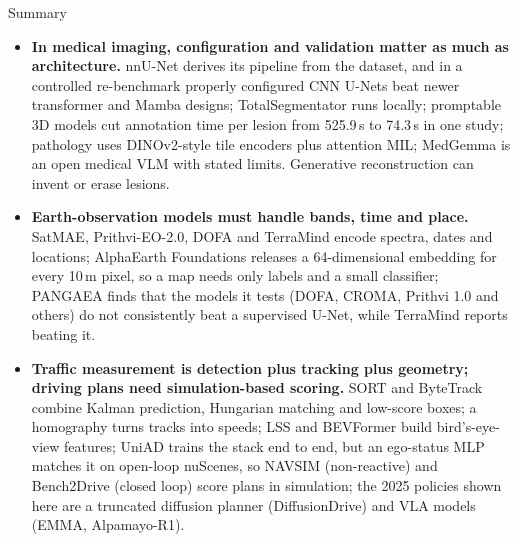 \begin{frame}[allowframebreaks]{Summary}
\begin{itemize}
    \item \textbf{In medical imaging, configuration and validation matter as much as architecture.} nnU-Net derives its pipeline from the dataset, and in a controlled re-benchmark properly configured CNN U-Nets beat newer transformer and Mamba designs; TotalSegmentator runs locally; promptable 3D models cut annotation time per lesion from 525.9\,s to 74.3\,s in one study; pathology uses DINOv2-style tile encoders plus attention MIL; MedGemma is an open medical VLM with stated limits. Generative reconstruction can invent or erase lesions.
    \item \textbf{Earth-observation models must handle bands, time and place.} SatMAE, Prithvi-EO-2.0, DOFA and TerraMind encode spectra, dates and locations; AlphaEarth Foundations releases a 64-dimensional embedding for every 10\,m pixel, so a map needs only labels and a small classifier; PANGAEA finds that the models it tests (DOFA, CROMA, Prithvi 1.0 and others) do not consistently beat a supervised U-Net, while TerraMind reports beating it.
    \item \textbf{Traffic measurement is detection plus tracking plus geometry; driving plans need simulation-based scoring.} SORT and ByteTrack combine Kalman prediction, Hungarian matching and low-score boxes; a homography turns tracks into speeds; LSS and BEVFormer build bird's-eye-view features; UniAD trains the stack end to end, but an ego-status MLP matches it on open-loop nuScenes, so NAVSIM (non-reactive) and Bench2Drive (closed loop) score plans in simulation; the 2025 policies shown here are a truncated diffusion planner (DiffusionDrive) and VLA models (EMMA, Alpamayo-R1).
  \end{itemize}
\end{frame}
